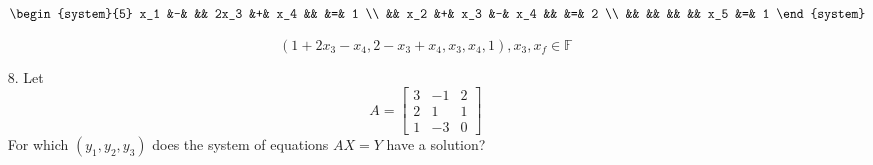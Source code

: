 \documentclass{article}
\begin{document}
\begin{enumerate}[listparindent=\parindent]
\[
    \begin{system}{5}
        x_1 &-& && 2x_3 &+& x_4 && &=& 1 \\
        && x_2 &+& x_3 &-& x_4 && &=& 2 \\
        && && && && x_5 &=& 1
    \end{system}
\]

\[
    \boxed{
        (1 + 2x_3 - x_4, 2 - x_3 + x_4, x_3, x_4, 1), x_3, x_f \in \mathbb F
    }
\]

\item[8.] Let
    \[
        A = \begin{bmatrix}
            3 & -1 & 2 \\
            2 & 1 & 1 \\
            1 & -3 & 0
        \end{bmatrix}
    \]
    For which \( (y_1, y_2, y_3) \) does the system of equations \(AX = Y\) have a solution?


\end{enumerate}
\end{document}
